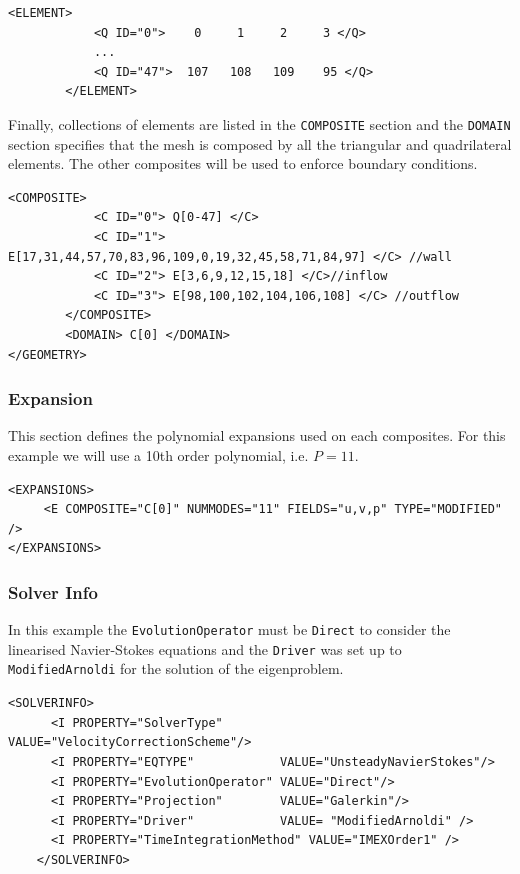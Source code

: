   \begin{lstlisting}[style=XMLStyle]
        <ELEMENT>
            <Q ID="0">    0     1     2     3 </Q>
            ...
            <Q ID="47">  107   108   109    95 </Q>
        </ELEMENT>
        \end{lstlisting}

Finally, collections of elements are listed in the \texttt{COMPOSITE} section and the \texttt{DOMAIN} section specifies that the mesh is composed by all the triangular and quadrilateral elements. The other composites will be used to enforce boundary conditions.

  \begin{lstlisting}[style=XMLStyle]
              <COMPOSITE>
            <C ID="0"> Q[0-47] </C>
            <C ID="1"> E[17,31,44,57,70,83,96,109,0,19,32,45,58,71,84,97] </C> //wall
            <C ID="2"> E[3,6,9,12,15,18] </C>//inflow
            <C ID="3"> E[98,100,102,104,106,108] </C> //outflow
        </COMPOSITE>
        <DOMAIN> C[0] </DOMAIN>
</GEOMETRY>
  \end{lstlisting}

  \subsubsection{Expansion}

  This section defines the polynomial expansions used on each composites. For this example we will use a 10th order polynomial, i.e. $P=11$.

  \begin{lstlisting}[style=XMLStyle]
<EXPANSIONS>
     <E COMPOSITE="C[0]" NUMMODES="11" FIELDS="u,v,p" TYPE="MODIFIED" />
</EXPANSIONS>
  \end{lstlisting}

  \subsubsection{Solver Info}

  In this example the \texttt{EvolutionOperator} must be \texttt{Direct} to consider the linearised Navier-Stokes equations and the \texttt{Driver} was set up to \texttt{ModifiedArnoldi} for the solution of the eigenproblem.

    \begin{lstlisting}[style=XMLStyle]
      <SOLVERINFO>
      <I PROPERTY="SolverType"        VALUE="VelocityCorrectionScheme"/>
      <I PROPERTY="EQTYPE"            VALUE="UnsteadyNavierStokes"/>
      <I PROPERTY="EvolutionOperator" VALUE="Direct"/>
      <I PROPERTY="Projection"        VALUE="Galerkin"/>
      <I PROPERTY="Driver"            VALUE= "ModifiedArnoldi" />
      <I PROPERTY="TimeIntegrationMethod" VALUE="IMEXOrder1" />
    </SOLVERINFO>
      \end{lstlisting}


